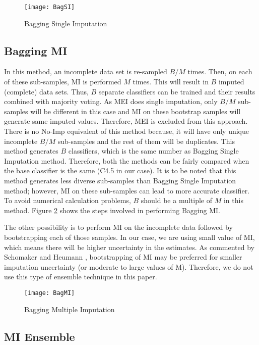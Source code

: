 \documentclass{iosart2c}
\begin{document}
\begin{figure}[htb]
    \centering
    \texttt{[image: BagSI]}
    \caption{Bagging Single Imputation}
    \label{fig:BagSI}
\end{figure}

\subsection{Bagging MI}

In this method, an incomplete data set is re-sampled $B/M$ times. Then, on each of these sub-samples, MI is performed $M$ times. This will result in $B$ imputed (complete) data sets. Thus, $B$ separate classifiers can be trained and their results combined with majority voting. As MEI does single imputation, only $B/M$ sub-samples will be different in this case and MI on these bootstrap samples will generate same imputed values. Therefore, MEI is excluded from this approach. There is no No-Imp equivalent of this method because, it will have only unique incomplete $B/M$ sub-samples and the rest of them will be duplicates. 
This method generates $B$ classifiers, which is the same number as Bagging Single Imputation method. Therefore, both the methods can be fairly compared when the base classifier is the same (C4.5 in our case).
It is to be noted that this method generates less diverse sub-samples than Bagging Single Imputation method; however, MI on these sub-samples can lead to more accurate classifier. To avoid numerical calculation problems, $B$ should be a multiple of $M$ in this method. Figure \ref{fig:BagMI} shows the steps involved in performing Bagging MI.

The other possibility is to perform MI on the incomplete data followed by bootstrapping each of those samples. In our case, we are using small value of MI, which means there will be higher uncertainty in the estimates. As commented by Schomaker and Heumann \cite{schomaker2016bootstrap}, bootstrapping of MI may be preferred for smaller imputation uncertainty (or moderate to large values of M). Therefore, we do not use this type of ensemble technique in this paper.

\begin{figure}[htb]
    \centering
    \texttt{[image: BagMI]}
    \caption{Bagging Multiple Imputation}
    \label{fig:BagMI}
\end{figure}

\subsection{MI Ensemble}
\end{document}
